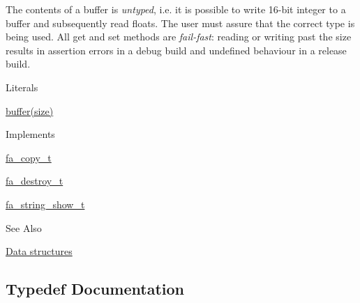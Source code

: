 The contents of a buffer is {\itshape untyped}, i.\-e. it is possible to write 16-\/bit integer to a buffer and subsequently read floats. The user must assure that the correct type is being used. All {\ttfamily get} and {\ttfamily set} methods are {\itshape fail-\/fast}\-: reading or writing past the size results in assertion errors in a debug build and undefined behaviour in a release build.

\begin{DoxyParagraph}{Literals}

\begin{DoxyItemize}
\item {\ttfamily \hyperlink{util_8h_ad0c623e8b04565926f5b48888327724a}{buffer(size)}}
\end{DoxyItemize}
\end{DoxyParagraph}
\begin{DoxyParagraph}{Implements }

\begin{DoxyItemize}
\item \hyperlink{structfa__copy__t}{fa\-\_\-copy\-\_\-t}
\item \hyperlink{structfa__destroy__t}{fa\-\_\-destroy\-\_\-t}
\item \hyperlink{structfa__string__show__t}{fa\-\_\-string\-\_\-show\-\_\-t}
\end{DoxyItemize}
\end{DoxyParagraph}
\begin{DoxySeeAlso}{See Also}

\begin{DoxyItemize}
\item \hyperlink{md__data_structures_DataStructures}{Data structures} 
\end{DoxyItemize}
\end{DoxySeeAlso}


\subsection{Typedef Documentation}
\hypertarget{group___fa_buffer_ga0ed7a1d783ab322e2e8be02432d0839e}{
\subsubsection[{fa\-\_\-buffer\-\_\-t}]{}}\label{group___fa_buffer_ga0ed7a1d783ab322e2e8be02432d0839e}


